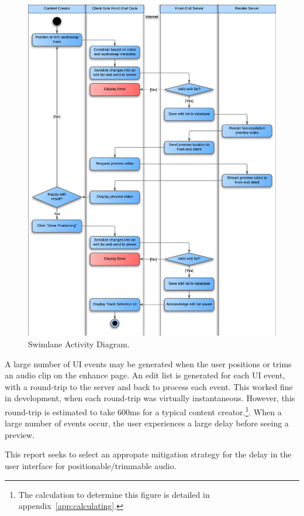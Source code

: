 \documentclass[se,resubmit]{uw-wkrpt}
\begin{document}
\begin{figure}
  \centering
  \includegraphics{swimlane}
  \caption{Swimlane Activity Diagram.}
  \label{fig:swimlane}
\end{figure}

A large number of UI events may be generated when the user positions or
trims an audio clip on the enhance page. An edit list is generated for each
UI event, with a round-trip to the server and back to process each event.
This worked fine in development, when each round-trip was virtually
instantaneous. However, this round-trip is estimated to take 600ms for a
typical content creator.\footnote{The calculation to determine this figure
is detailed in appendix~\ref{app:calculating}.}. When a large number of
events occur, the user experiences a large delay before seeing a preview.

This report seeks to select an appropate mitigation strategy for the delay
in the user interface for positionable/trimmable audio.
\end{document}
